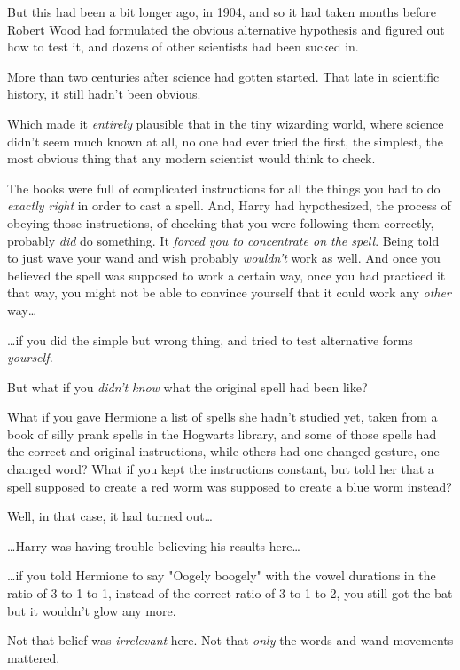 But this had been a bit longer ago, in 1904, and so it had taken months before 
Robert Wood had formulated the obvious alternative hypothesis and figured out 
how to test it, and dozens of other scientists had been sucked in.

More than two centuries after science had gotten started. That late in 
scientific history, it still hadn't been obvious.

Which made it \emph{entirely} plausible that in the tiny wizarding world, where 
science didn't seem much known at all, no one had ever tried the first, the 
simplest, the most obvious thing that any modern scientist would think to check.

The books were full of complicated instructions for all the things you had to 
do \emph{exactly right} in order to cast a spell. And, Harry had hypothesized, 
the process of obeying those instructions, of checking that you were following 
them correctly, probably \emph{did} do something. It \emph{forced you to 
concentrate on the spell}. Being told to just wave your wand and wish probably 
\emph{wouldn't} work as well. And once you believed the spell was supposed to 
work a certain way, once you had practiced it that way, you might not be able 
to convince yourself that it could work any \emph{other} way{\ldots}

{\ldots}if you did the simple but wrong thing, and tried to test alternative 
forms \emph{yourself.}

But what if you \emph{didn't know} what the original spell had been like?

What if you gave Hermione a list of spells she hadn't studied yet, taken from a 
book of silly prank spells in the Hogwarts library, and some of those spells 
had the correct and original instructions, while others had one changed 
gesture, one changed word? What if you kept the instructions constant, but told 
her that a spell supposed to create a red worm was supposed to create a blue 
worm instead?

Well, in that case, it had turned out{\ldots}

{\ldots}Harry was having trouble believing his results here{\ldots}

{\ldots}if you told Hermione to say "Oogely boogely" with the vowel durations 
in the ratio of 3 to 1 to 1, instead of the correct ratio of 3 to 1 to 2, you 
still got the bat but it wouldn't glow any more.

Not that belief was \emph{irrelevant} here. Not that \emph{only} the words and 
wand movements mattered.

